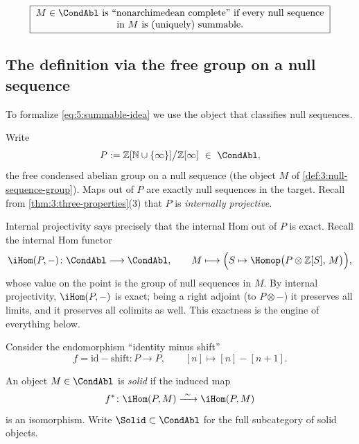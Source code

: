 \begin{equation}
\label{eq:5:summable-idea}
\boxed{\begin{minipage}{0.88\linewidth}\centering
$M\in\CondAbl$ is ``nonarchimedean complete'' if every null sequence in $M$
is (uniquely) summable.
\end{minipage}}
\end{equation}

\subsection{The definition via the free group on a null sequence}

To formalize \eqref{eq:5:summable-idea} we use the object that classifies null
sequences.

\begin{notation}
\label{not:5:P}
Write
\begin{equation*}
P:=\mathbb{Z}[\mathbb{N}\cup\{\infty\}]\big/\mathbb{Z}[\infty]\ \in\ \CondAbl,
\end{equation*}
the free condensed abelian group on a null sequence (the object $M$ of
\cref{def:3:null-sequence-group}). Maps out of $P$ are exactly null sequences in
the target. Recall from \cref{thm:3:three-properties}(3) that $P$ is
\emph{internally projective}.
\end{notation}

Internal projectivity says precisely that the internal Hom out of $P$ is exact.
Recall the internal Hom functor
\begin{equation*}
\iHom(P,-)\colon\CondAbl\longrightarrow\CondAbl,\qquad
M\longmapsto\Bigl(S\mapsto\Homop\bigl(P\otimes\mathbb{Z}[S],\,M\bigr)\Bigr),
\end{equation*}
whose value on the point is the group of null sequences in $M$. By internal
projectivity, $\iHom(P,-)$ is exact; being a right adjoint (to $P\otimes-$) it
preserves all limits, and it preserves all colimits as well. This exactness is
the engine of everything below.

Consider the endomorphism ``identity minus shift''
\begin{equation}
\label{eq:5:shift}
f=\mathrm{id}-\mathrm{shift}\colon P\longrightarrow P,\qquad
[n]\longmapsto[n]-[n+1].
\end{equation}

\begin{definition}
\label{def:5:solid}
An object $M\in\CondAbl$ is \emph{solid} if the induced map
\begin{equation}
\label{eq:5:solid-def}
f^{\ast}\colon\iHom(P,M)\xrightarrow{\ \sim\ }\iHom(P,M)
\end{equation}
is an isomorphism. Write $\Solid\subset\CondAbl$ for the full subcategory of solid
objects.
\end{definition}

